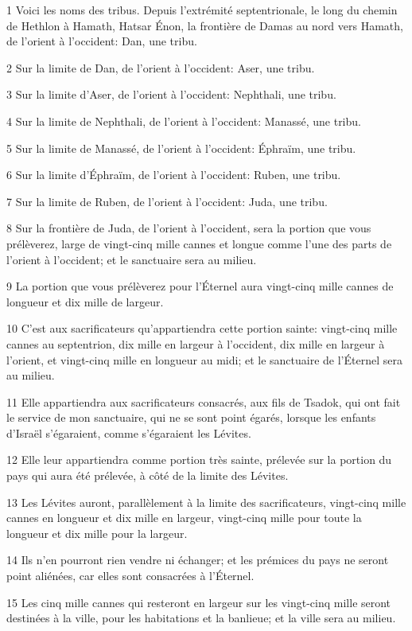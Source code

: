 \par 1 Voici les noms des tribus. Depuis l'extrémité septentrionale, le long du chemin de Hethlon à Hamath, Hatsar Énon, la frontière de Damas au nord vers Hamath, de l'orient à l'occident: Dan, une tribu.
\par 2 Sur la limite de Dan, de l'orient à l'occident: Aser, une tribu.
\par 3 Sur la limite d'Aser, de l'orient à l'occident: Nephthali, une tribu.
\par 4 Sur la limite de Nephthali, de l'orient à l'occident: Manassé, une tribu.
\par 5 Sur la limite de Manassé, de l'orient à l'occident: Éphraïm, une tribu.
\par 6 Sur la limite d'Éphraïm, de l'orient à l'occident: Ruben, une tribu.
\par 7 Sur la limite de Ruben, de l'orient à l'occident: Juda, une tribu.
\par 8 Sur la frontière de Juda, de l'orient à l'occident, sera la portion que vous prélèverez, large de vingt-cinq mille cannes et longue comme l'une des parts de l'orient à l'occident; et le sanctuaire sera au milieu.
\par 9 La portion que vous prélèverez pour l'Éternel aura vingt-cinq mille cannes de longueur et dix mille de largeur.
\par 10 C'est aux sacrificateurs qu'appartiendra cette portion sainte: vingt-cinq mille cannes au septentrion, dix mille en largeur à l'occident, dix mille en largeur à l'orient, et vingt-cinq mille en longueur au midi; et le sanctuaire de l'Éternel sera au milieu.
\par 11 Elle appartiendra aux sacrificateurs consacrés, aux fils de Tsadok, qui ont fait le service de mon sanctuaire, qui ne se sont point égarés, lorsque les enfants d'Israël s'égaraient, comme s'égaraient les Lévites.
\par 12 Elle leur appartiendra comme portion très sainte, prélevée sur la portion du pays qui aura été prélevée, à côté de la limite des Lévites.
\par 13 Les Lévites auront, parallèlement à la limite des sacrificateurs, vingt-cinq mille cannes en longueur et dix mille en largeur, vingt-cinq mille pour toute la longueur et dix mille pour la largeur.
\par 14 Ils n'en pourront rien vendre ni échanger; et les prémices du pays ne seront point aliénées, car elles sont consacrées à l'Éternel.
\par 15 Les cinq mille cannes qui resteront en largeur sur les vingt-cinq mille seront destinées à la ville, pour les habitations et la banlieue; et la ville sera au milieu.

